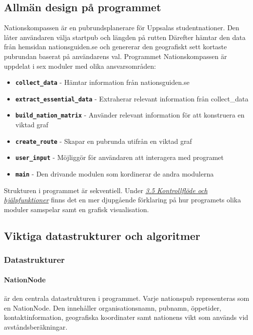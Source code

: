 \documentclass[a4paper, 12pt]{article}
\begin{document}
    \subsection{Allmän design på programmet}
    \label{subsec: design}
        Nationskompassen är en pubrundsplanerare för Uppsalas studentnationer. Den låter användaren välja startpub och längden på rutten Därefter hämtar den data från hemsidan nationsguiden.se och genererar den geografiskt sett kortaste pubrundan baserat på användarens val. Programmet Nationskompassen är uppdelat i sex moduler med olika ansvarsområden:
        \begin{itemize}
            \item \textbf{\texttt{collect\_data}} - Hämtar information från nationsguiden.se
            \item \textbf{\texttt{extract\_essential\_data}} - Extraherar relevant information från collect\_data
            \item \textbf{\texttt{build\_nation\_matrix}} - Använder relevant information för att konstruera en viktad graf
            \item \textbf{\texttt{create\_route}} - Skapar en pubrunda utifrån en viktad graf
            \item \textbf{\texttt{user\_input}} - Möjliggör för användaren att interagera med programet
            \item \textbf{\texttt{main}} - Den drivande modulen som kordinerar de andra modulerna
        \end{itemize}
        Strukturen i programmet är sekventiell. Under \hyperref[subsec: flöde]{\textit{3.5 Kontrollflöde och hjälpfunktioner}} finns det en mer djupgående förklaring på hur programets olika moduler samspelar samt en grafisk visualisation. 

    \subsection{Viktiga datastrukturer och algoritmer}
    \label{subsec: DSAL}

        \subsubsection{Datastrukturer}
        \label{subsubsec: DS}
            \paragraph{NationNode}
                är den centrala datastrukturen i programmet. Varje nationspub representeras som en NationNode. Den innehåller organisationsnamn, pubnamn, öppetider, kontaktinformation, geografiska koordinater samt nationens vikt som används vid avståndsberäkningar.
\end{document}
